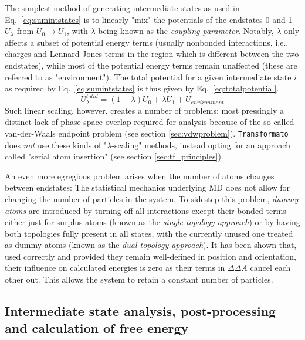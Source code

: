 \documentclass[oneside]{scrreprt}
\begin{document}
The simplest method of generating intermediate states as used in Eq.~\ref{eq:sumintstates} is to linearly "mix" the  potentials of the endstates 0 and 1 $U_\lambda$ from $U_0 \rightarrow U_1$, with $\lambda$ being known as the \emph{coupling parameter}. Notably, $\lambda$ only affects a subset of potential energy terms (usually nonbonded interactions, i.e., charges and Lennard-Jones terms in the region which is different between the two endstates), while most of the potential energy terms remain unaffected (these are referred to as "environment"). The total potential for a given intermediate state $i$ as required by Eq.~\ref{eq:sumintstates} is thus given by Eq.~\ref{eq:totalpotential}.
\begin{equation}
U^{total}_\lambda   = (1-\lambda)U_0 + \lambda U_1  + U_{environment}
\label{eq:totalpotential}
\end{equation}
Such linear scaling, however, creates a number of problems; most pressingly a distinct lack of phase space overlap required for analysis because of the so-called van-der-Waals endpoint problem (see section \ref{sec:vdwproblem}). \texttt{Transformato} does \emph{not} use these kinds of "$\lambda$-scaling" methods, instead opting for an approach called "serial atom insertion" (see section \ref{sec:tf_principles}).

An even more egregious problem arises when the number of atoms changes between endstates: The statistical mechanics underlying MD does not allow for changing the number of particles in the system. To sidestep this problem, \emph{dummy atoms} are introduced by turning off all interactions except their bonded terms - either just for surplus atoms (known as the \emph{single topology approach}) or by having both topologies fully present in all states, with the currently unused one treated as dummy atoms (known as the \emph{dual topology approach}). It has been shown that, used correctly and provided they remain well-defined in position and orientation, their influence on calculated energies is zero as their terms in $\Delta \Delta A$  cancel each other out\cite{fleckDummyAtomsAlchemical2021}. This allows the system to retain a constant number of particles.

\subsection{Intermediate state analysis, post-processing and calculation of free energy}\label{sec:engycalc}
\end{document}
